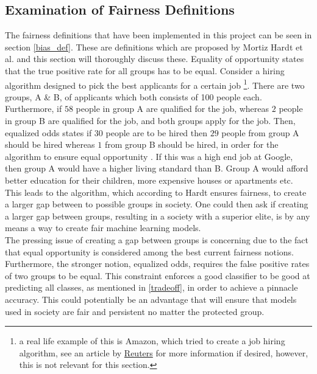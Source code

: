 \documentclass[11pt, fleqn, titlepage]{article}
\begin{document}
	\subsection{Examination of Fairness Definitions}\label{examination_of_fairness_definitions}
	The fairness definitions that have been implemented in this project can be seen in section \ref{bias_def}. These are definitions which are proposed by Mortiz Hardt et al. and this section will thoroughly discuss these. Equality of opportunity states that the true positive rate for all groups has to be equal. Consider a hiring algorithm designed to pick the best applicants for a certain job \footnote{a real life example of this is Amazon, which tried to create a job hiring algorithm, see an article by \href{https://www.reuters.com/article/us-amazon-com-jobs-automation-insight/amazon-scraps-secret-ai-recruiting-tool-that-showed-bias-against-women-idUSKCN1MK08G}{Reuters} for more information if desired, however, this is not relevant for this section.}. There are two groups, A \& B, of applicants which both consists of 100 people each. Furthermore, if $ 58 $ people in group A are qualified for the job, whereas $ 2 $ people in group B are qualified for the job, and both groups apply for the job. Then, equalized odds states if $ 30 $ people are to be hired then $ 29 $ people from group A should be hired whereas $ 1 $ from group B should be hired, in order for the algorithm to ensure equal opportunity \cite{towardsdata}. If this was a high end job at Google, then group A would have a higher living standard than B. Group A would afford better education for their children, more expensive houses or apartments etc. This leads to the algorithm, which according to Hardt ensures fairness, to create a larger gap between to possible groups in society. One could then ask if creating a larger gap between groups, resulting in a society with a superior elite, is by any means a way to create fair machine learning models. \newline
	\\
	\noindent 
	The pressing issue of creating a gap between groups is concerning due to the fact that equal opportunity is considered among the best current fairness notions. Furthermore, the stronger notion, equalized odds, requires the false positive rates of two groups to be equal. This constraint enforces a good classifier to be good at predicting all classes, as mentioned in \ref{tradeoff}, in order to achieve a pinnacle accuracy. This could potentially be an advantage that will ensure that models used in society are fair and persistent no matter the protected group. 
	
\end{document}
